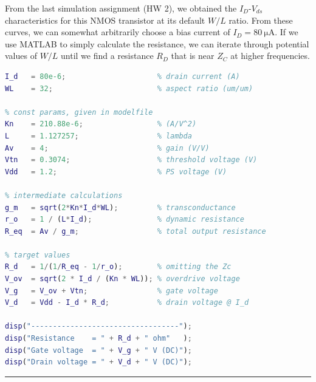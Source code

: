 \documentclass{homework}
\begin{document}
	\pagebreak
	\noindent From the last simulation assignment (HW 2), we obtained the $I_D$-$V_{ds}$ characteristics for this NMOS transistor at its default $W/L$ ratio. From these curves, we can somewhat arbitrarily choose a bias current of $I_D = \SI{80}{\micro\ampere}$. If we use MATLAB to simply calculate the resistance, we can iterate through potential values of $W/L$ until we find a resistance $R_D$ that is near $Z_C$ at higher frequencies. 
		
\begin{lstlisting}[language=matlab]
% parameters to try out
I_d   = 80e-6;                     % drain current (A)
WL    = 32;                        % aspect ratio (um/um)

% const params, given in modelfile
Kn    = 210.88e-6;                 % (A/V^2)
L     = 1.127257;                  % lambda
Av    = 4;                         % gain (V/V)
Vtn   = 0.3074;                    % threshold voltage (V)
Vdd   = 1.2;                       % PS voltage (V)

% intermediate calculations
g_m   = sqrt(2*Kn*I_d*WL);         % transconductance
r_o   = 1 / (L*I_d);               % dynamic resistance
R_eq  = Av / g_m;                  % total output resistance

% target values
R_d   = 1/(1/R_eq - 1/r_o);        % omitting the Zc
V_ov  = sqrt(2 * I_d / (Kn * WL)); % overdrive voltage
V_g   = V_ov + Vtn;                % gate voltage
V_d   = Vdd - I_d * R_d;           % drain voltage @ I_d

disp("----------------------------------");
disp("Resistance    = " + R_d + " ohm"   );
disp("Gate voltage  = " + V_g + " V (DC)");
disp("Drain voltage = " + V_d + " V (DC)");
\end{lstlisting}
\hrule
\vspace{1em}
\end{document}
